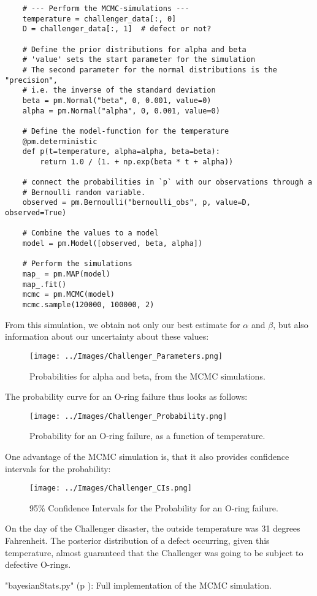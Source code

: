 \begin{lstlisting}
    # --- Perform the MCMC-simulations ---
    temperature = challenger_data[:, 0]
    D = challenger_data[:, 1]  # defect or not?

    # Define the prior distributions for alpha and beta
    # 'value' sets the start parameter for the simulation
    # The second parameter for the normal distributions is the "precision",
    # i.e. the inverse of the standard deviation
    beta = pm.Normal("beta", 0, 0.001, value=0)
    alpha = pm.Normal("alpha", 0, 0.001, value=0)

    # Define the model-function for the temperature
    @pm.deterministic
    def p(t=temperature, alpha=alpha, beta=beta):
        return 1.0 / (1. + np.exp(beta * t + alpha))

    # connect the probabilities in `p` with our observations through a
    # Bernoulli random variable.
    observed = pm.Bernoulli("bernoulli_obs", p, value=D, observed=True)

    # Combine the values to a model
    model = pm.Model([observed, beta, alpha])

    # Perform the simulations
    map_ = pm.MAP(model)
    map_.fit()
    mcmc = pm.MCMC(model)
    mcmc.sample(120000, 100000, 2)
\end{lstlisting}

From this simulation, we obtain not only our best estimate for $\alpha$ and $\beta$, but also information about our uncertainty about these values:

\begin{figure}[H]
  \centering
  \texttt{[image: ../Images/Challenger\_Parameters.png]}\\
  \caption{Probabilities for alpha and beta, from the MCMC simulations.}
\end{figure}

The probability curve for an O-ring failure thus looks as follows:

\begin{figure}[H]
  \centering
  \texttt{[image: ../Images/Challenger\_Probability.png]}\\
  \caption{Probability for an O-ring failure, as a function of temperature.}
\end{figure}

One advantage of the MCMC simulation is, that it also provides confidence intervals for the probability:

\begin{figure}[H]
  \centering
  \texttt{[image: ../Images/Challenger\_CIs.png]}\\
  \caption{95\% Confidence Intervals for the Probability for an O-ring failure.}
\end{figure}

On the day of the Challenger disaster, the outside temperature was 31 degrees Fahrenheit. The posterior distribution of a defect occurring, given this temperature, almost guaranteed that the Challenger was going to be subject to defective O-rings.

\PyImg "bayesianStats.py" (p \pageref{py:bayesianStats}): Full implementation of the MCMC simulation.

